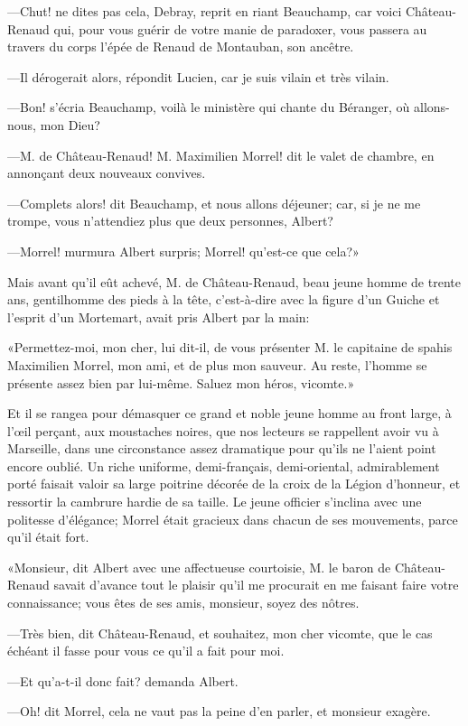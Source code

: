 —Chut! ne dites pas cela, Debray, reprit en riant Beauchamp, car voici Château-Renaud qui, pour vous guérir de votre manie de paradoxer, vous passera au travers du corps l'épée de Renaud de Montauban, son ancêtre. 

—Il dérogerait alors, répondit Lucien, car je suis vilain et très vilain. 

—Bon! s'écria Beauchamp, voilà le ministère qui chante du Béranger, où allons-nous, mon Dieu? 

—M. de Château-Renaud! M. Maximilien Morrel! dit le valet de chambre, en annonçant deux nouveaux convives. 

—Complets alors! dit Beauchamp, et nous allons déjeuner; car, si je ne me trompe, vous n'attendiez plus que deux personnes, Albert? 

—Morrel! murmura Albert surpris; Morrel! qu'est-ce que cela?» 

Mais avant qu'il eût achevé, M. de Château-Renaud, beau jeune homme de trente ans, gentilhomme des pieds à la tête, c'est-à-dire avec la figure d'un Guiche et l'esprit d'un Mortemart, avait pris Albert par la main: 

«Permettez-moi, mon cher, lui dit-il, de vous présenter M. le capitaine de spahis Maximilien Morrel, mon ami, et de plus mon sauveur. Au reste, l'homme se présente assez bien par lui-même. Saluez mon héros, vicomte.» 

Et il se rangea pour démasquer ce grand et noble jeune homme au front large, à l'œil perçant, aux moustaches noires, que nos lecteurs se rappellent avoir vu à Marseille, dans une circonstance assez dramatique pour qu'ils ne l'aient point encore oublié. Un riche uniforme, demi-français, demi-oriental, admirablement porté faisait valoir sa large poitrine décorée de la croix de la Légion d'honneur, et ressortir la cambrure hardie de sa taille. Le jeune officier s'inclina avec une politesse d'élégance; Morrel était gracieux dans chacun de ses mouvements, parce qu'il était fort. 

«Monsieur, dit Albert avec une affectueuse courtoisie, M. le baron de Château-Renaud savait d'avance tout le plaisir qu'il me procurait en me faisant faire votre connaissance; vous êtes de ses amis, monsieur, soyez des nôtres.  

—Très bien, dit Château-Renaud, et souhaitez, mon cher vicomte, que le cas échéant il fasse pour vous ce qu'il a fait pour moi. 

—Et qu'a-t-il donc fait? demanda Albert. 

—Oh! dit Morrel, cela ne vaut pas la peine d'en parler, et monsieur exagère. 

